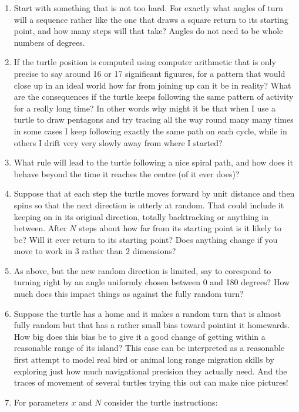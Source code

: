 \begin{enumerate}
\item Start with something that is not too hard. For exactly what angles of
turn will a sequence rather like the one that draws a square return to
its starting point, and how many steps will that take? Angles do not need
to be whole numbers of degrees.
\item If the turtle position is computed using computer arithmetic that is
only precise to say around 16 or 17 significant figuures, for a pattern that
would close up in an ideal world how far from joining up can it be in
reality? What are the consequences if the turtle keeps following the same
pattern of activity for a really long time? In other words why might it
be that when I use a turtle to draw pentagons and try tracing all the
way round many many times in some cases I keep following exactly the
same path on each cycle, while in others I drift very very slowly away
from where I started?
\item What rule will lead to the turtle following a nice spiral path,
and how does it behave beyond the time it reaches the centre (of it ever does)?
\item Suppose that at each step the turtle moves forward by unit distance and
then spins so that the next direction is utterly at random. That could include
it keeping on in its original direction, totally backtracking or anything in
between. After $N$ steps about how far from its starting point is it
likely to be? Will it ever return to its starting point? Does anything
change if you move to work in 3 rather than 2 dimensions?
\item As above, but the new random direction is limited, say to corespond
to turning right by an angle uniformly chosen between 0 and 180 degrees? How
much does this impact things as against the fully random turn?
\item Suppose the turtle has a home and it makes a random turn that is almost
fully random but that has a rather small bias toward pointint it homewards.
How big does this bias be to give it a good change of getting within
a reasonable range of its island? This case can be interpreted as a reasonable
first attempt to model real bird or animal long range migration skills
by exploring just how much navigational precision they actually need. And
the traces of movement of several turtles trying this out can make nice
pictures!
\item For parameters $x$ and $N$ consider the turtle instructions:
\begin{verbatim}

\end{verbatim}
\end{enumerate}
